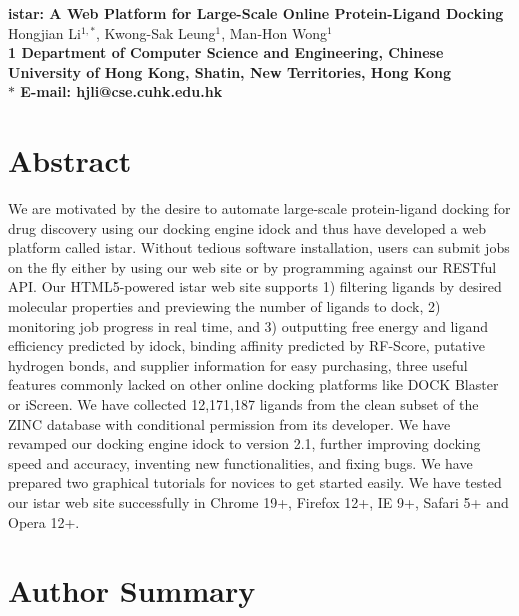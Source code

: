\documentclass[10pt]{article}
\date{}
\begin{document}
\begin{flushleft}
{\Large
\textbf{istar: A Web Platform for Large-Scale Online Protein-Ligand Docking}
}
\\
Hongjian Li$^{1,\ast}$, 
Kwong-Sak Leung$^{1}$, 
Man-Hon Wong$^{1}$
\\
\bf{1} Department of Computer Science and Engineering, Chinese University of Hong Kong, Shatin, New Territories, Hong Kong
\\
$\ast$ E-mail: hjli@cse.cuhk.edu.hk
\end{flushleft}

\section*{Abstract}
We are motivated by the desire to automate large-scale protein-ligand docking for drug discovery using our docking engine idock and thus have developed a web platform called istar. Without tedious software installation, users can submit jobs on the fly either by using our web site or by programming against our RESTful API. Our HTML5-powered istar web site supports 1) filtering ligands by desired molecular properties and previewing the number of ligands to dock, 2) monitoring job progress in real time, and 3) outputting free energy and ligand efficiency predicted by idock, binding affinity predicted by RF-Score, putative hydrogen bonds, and supplier information for easy purchasing, three useful features commonly lacked on other online docking platforms like DOCK Blaster or iScreen. We have collected 12,171,187 ligands from the clean subset of the ZINC database with conditional permission from its developer. We have revamped our docking engine idock to version 2.1, further improving docking speed and accuracy, inventing new functionalities, and fixing bugs. We have prepared two graphical tutorials for novices to get started easily. We have tested our istar web site successfully in Chrome 19+, Firefox 12+, IE 9+, Safari 5+ and Opera 12+.

\section*{Author Summary}
\end{document}
